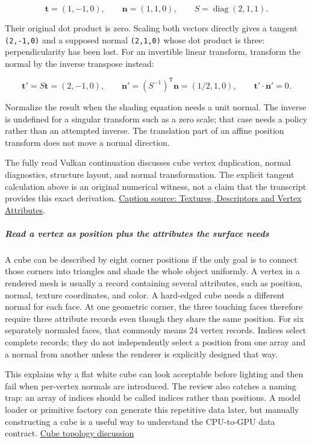 \[
\mathbf{t}=(1,-1,0),\qquad \mathbf{n}=(1,1,0),\qquad S=\operatorname{diag}(2,1,1).
\]

Their original dot product is zero. Scaling both vectors directly gives a tangent \texttt{(2,-1,0)} and a supposed normal \texttt{(2,1,0)} whose dot product is three: perpendicularity has been lost. For an invertible linear transform, transform the normal by the inverse transpose instead:

\[
\mathbf{t}'=S\mathbf{t}=(2,-1,0),\qquad
\mathbf{n}'=(S^{-1})^{\mathsf T}\mathbf{n}=(1/2,1,0),\qquad
\mathbf{t}'\cdot\mathbf{n}'=0.
\]

Normalize the result when the shading equation needs a unit normal. The inverse is undefined for a singular transform such as a zero scale; that case needs a policy rather than an attempted inverse. The translation part of an affine position transform does not move a normal direction.

The fully read Vulkan continuation discusses cube vertex duplication, normal diagnostics, structure layout, and normal transformation. The explicit tangent calculation above is an original numerical witness, not a claim that the transcript provides this exact derivation. \href{https://www.youtube.com/watch?v=QFf91u8bZlk}{Caption source: Textures, Descriptors and Vertex Attributes}.

\subparagraph{Read a vertex as position plus the attributes the surface needs}\label{read-a-vertex-as-position-plus-the-attributes-the-surface-needs}

A cube can be described by eight corner positions if the only goal is to connect those corners into triangles and shade the whole object uniformly. A vertex in a rendered mesh is usually a record containing several attributes, such as position, normal, texture coordinates, and color. A hard-edged cube needs a different normal for each face. At one geometric corner, the three touching faces therefore require three attribute records even though they share the same position. For six separately normaled faces, that commonly means 24 vertex records. Indices select complete records; they do not independently select a position from one array and a normal from another unless the renderer is explicitly designed that way.

This explains why a flat white cube can look acceptable before lighting and then fail when per-vertex normals are introduced. The review also catches a naming trap: an array of indices should be called indices rather than positions. A model loader or primitive factory can generate this repetitive data later, but manually constructing a cube is a useful way to understand the CPU-to-GPU data contract. \href{https://www.youtube.com/watch?v=sIAXLH7ZqCw&t=13m50s}{Cube topology discussion}


